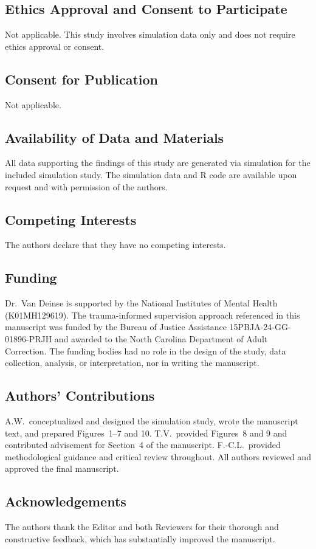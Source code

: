 \documentclass{article}[11pt]
\begin{document}
\subsection*{Ethics Approval and Consent to Participate}
Not applicable. This study involves simulation data only and does not require ethics approval or consent.

\subsection*{Consent for Publication}
Not applicable.

\subsection*{Availability of Data and Materials}
All data supporting the findings of this study are generated via simulation for the included simulation study. The simulation data and R code are available upon request and with permission of the authors.

\subsection*{Competing Interests}
The authors declare that they have no competing interests.

\subsection*{Funding}
Dr.\ Van Deinse is supported by the National Institutes of Mental Health (K01MH129619). The trauma-informed supervision approach referenced in this manuscript was funded by the Bureau of Justice Assistance 15PBJA-24-GG-01896-PRJH and awarded to the North Carolina Department of Adult Correction. The funding bodies had no role in the design of the study, data collection, analysis, or interpretation, nor in writing the manuscript.

\subsection*{Authors' Contributions}
A.W.\ conceptualized and designed the simulation study, wrote the manuscript text, and prepared Figures~1--7 and 10. T.V.\ provided Figures~8 and 9 and contributed advisement for Section~4 of the manuscript. F.-C.L.\ provided methodological guidance and critical review throughout. All authors reviewed and approved the final manuscript.

\subsection*{Acknowledgements}
The authors thank the Editor and both Reviewers for their thorough and constructive feedback, which has substantially improved the manuscript.
\end{document}

